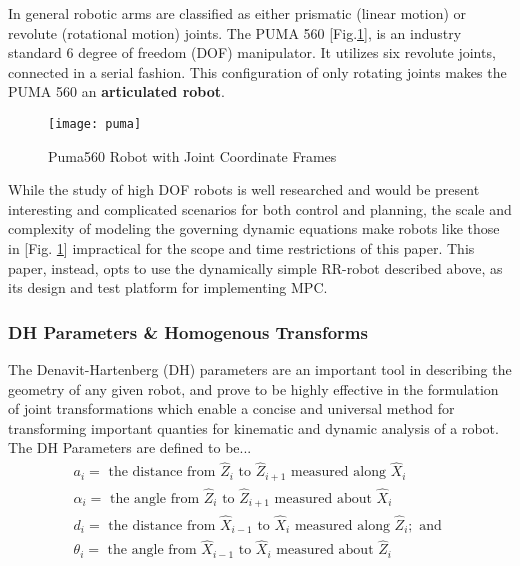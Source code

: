 \documentclass[journal]{IEEEtran}
\begin{document}
In general robotic arms are classified as either prismatic (linear motion) or revolute (rotational motion) joints. The PUMA 560 [Fig.\ref{puma560}], is an industry standard 6 degree of freedom (DOF) manipulator. It utilizes six revolute joints, connected in a serial fashion. This configuration of only rotating joints makes the PUMA 560 an \textbf{articulated robot}.

\begin{figure}
    \centering
    \texttt{[image: puma]}
    \caption{Puma560 Robot with Joint Coordinate Frames}
    \label{puma560}
\end{figure}

While the study of high DOF robots is well researched and would be present interesting and complicated scenarios for both control and planning, the scale and complexity of modeling the governing dynamic equations make robots like those in [Fig. \ref{puma560}] impractical for the scope and time restrictions of this paper. This paper, instead, opts to use the dynamically simple RR-robot described above, as its design and test platform for implementing MPC.



\subsubsection{DH Parameters \& Homogenous Transforms}

The Denavit-Hartenberg (DH) parameters are an important tool in describing the geometry of any given robot, and prove to be highly effective in the formulation of joint transformations which enable a concise and universal method for transforming important quanties for kinematic and dynamic analysis of a robot.\\

\noindent The DH Parameters are defined to be...
    $$
    \begin{array}{l}
    a_{i}=\text { the distance from } \hat{Z}_{i} \text { to } \hat{Z}_{i+1} \text { measured along } \hat{X}_{i} \\
    \alpha_{i}=\text { the angle from } \hat{Z}_{i} \text { to } \hat{Z}_{i+1} \text { measured about } \hat{X}_{i} \\
    d_{i}=\text { the distance from } \hat{X}_{i-1} \text { to } \hat{X}_{i} \text { measured along } \hat{Z}_{i} ; \text { and } \\
    \theta_{i}=\text { the angle from } \hat{X}_{i-1} \text { to } \hat{X}_{i} \text { measured about } \hat{Z}_{i}
    \end{array}
    $$
\end{document}
